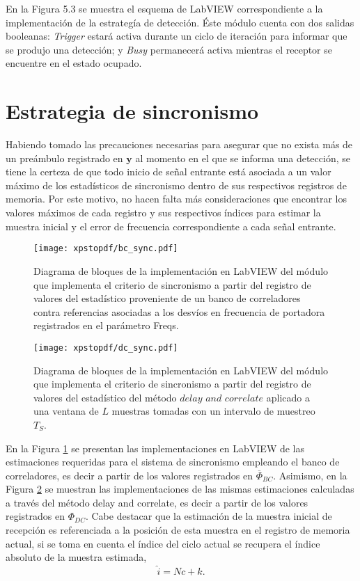 En la Figura 5.3 se muestra el esquema de LabVIEW correspondiente a la implementación de la estrategía de detección. Éste módulo cuenta con dos salidas booleanas: \textit{Trigger} estará activa durante un ciclo de iteración para informar que se produjo una detección; y \textit{Busy} permanecerá activa mientras el receptor se encuentre en el estado ocupado.

\section{Estrategia de sincronismo}
\label{S:ch5-sincronismo}

Habiendo tomado las precauciones necesarias para asegurar que no exista más de un preámbulo registrado en $\mathbf{y}$ al momento en el que se informa una detección, se tiene la certeza de que todo inicio de señal entrante está asociada a un valor máximo de los estadísticos de sincronismo dentro de sus respectivos registros de memoria. Por este motivo, no hacen falta más consideraciones que encontrar los valores máximos de cada registro y sus respectivos índices para estimar la muestra inicial y el error de frecuencia correspondiente a cada señal entrante.

\begin{figure}[t]
    \centering{}\texttt{[image: xpstopdf/bc\_sync.pdf]}
    \caption{Diagrama de bloques de la implementación en LabVIEW del módulo que implementa el criterio de sincronismo a partir del registro de valores del estadístico proveniente de un banco de correladores contra referencias asociadas a los desvíos en frecuencia de portadora registrados en el parámetro Freqs.\label{fig:bc-sync-lv}}  
\end{figure}

\begin{figure}[t]
    \centering{}\texttt{[image: xpstopdf/dc\_sync.pdf]}
    \caption{Diagrama de bloques de la implementación en LabVIEW del módulo que implementa el criterio de sincronismo a partir del registro de valores del estadístico del método $\textit{delay and correlate}$ aplicado a una ventana de $L$ muestras tomadas con un intervalo de muestreo $T_S$.\label{fig:dc-sync-lv}}  
\end{figure}

En la Figura \ref{fig:bc-sync-lv} se presentan las implementaciones en LabVIEW de las estimaciones requeridas para el sistema de sincronismo empleando el banco de correladores, es decir a partir de los valores registrados en $\overline{\Phi}_{BC}$. Asimismo, en la Figura \ref{fig:dc-sync-lv} se muestran las implementaciones de las mismas estimaciones calculadas a través del método delay and correlate, es decir a partir de los valores registrados en $\Phi_{DC}$. Cabe destacar que la estimación de la muestra inicial de recepción es referenciada a la posición de esta muestra en el registro de memoria actual, si se toma en cuenta el índice del ciclo actual se recupera el índice absoluto de la muestra estimada,
\begin{equation}
    \widehat{i} = Nc+\widehat{k}.
\end{equation}

